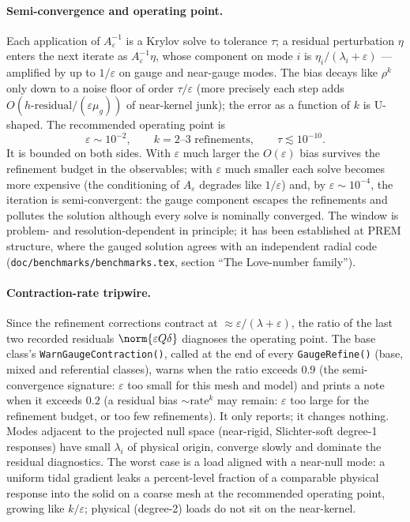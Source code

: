 \documentclass[11pt]{article}
\numberwithin{equation}{section}
\theoremstyle{remark}
\newcommand{\eps}{\varepsilon}
\newcommand{\code}[1]{\texttt{#1}}
\begin{document}
\paragraph{Semi-convergence and operating point.} Each application of
$A_\eps^{-1}$ is a Krylov solve to tolerance $\tau$; a residual
perturbation $\eta$ enters the next iterate as $A_\eps^{-1}\eta$, whose
component on mode $i$ is $\eta_i/(\lambda_i + \eps)$ --- amplified by up
to $1/\eps$ on gauge and near-gauge modes. The bias decays like $\rho^k$ only down to a
noise floor of order $\tau/\eps$ (more precisely each step adds
$O(h\text{-residual}/(\eps\mu_g))$ of near-kernel junk); the error as a
function of $k$ is U-shaped. The recommended operating point is
\begin{equation}
  \eps\sim10^{-2}, \qquad k = 2\text{--}3
  \text{ refinements}, \qquad \tau\lesssim10^{-10} .
\end{equation}
It is bounded on both sides. With $\eps$ much larger the $O(\eps)$ bias
survives the refinement budget in the observables; with $\eps$ much
smaller each solve becomes more expensive (the conditioning of $A_\eps$
degrades like $1/\eps$) and, by $\eps\sim10^{-4}$, the iteration is
semi-convergent: the gauge component escapes the refinements and
pollutes the solution although every solve is nominally converged. The
window is problem- and resolution-dependent in principle; it has been
established at PREM structure, where the gauged solution agrees with an
independent radial code (\code{doc/benchmarks/benchmarks.tex}, section ``The
Love-number family'').

\paragraph{Contraction-rate tripwire.} Since the refinement corrections
contract at $\approx\eps/(\lambda + \eps)$, the ratio of the last two
recorded residuals $\norm{\eps Q\delta}$ diagnoses the operating point.
The base class's \code{WarnGaugeContraction()}, called at the end of
every \code{GaugeRefine()} (base, mixed and referential classes), warns
when the ratio exceeds $0.9$
(the semi-convergence signature: $\eps$ too small for this mesh and model)
and prints a note when it exceeds $0.2$ (a residual bias $\sim
\text{rate}^k$ may remain: $\eps$ too large for the refinement budget, or
too few refinements). It only reports; it changes nothing.
Modes adjacent to the projected null space (near-rigid, Slichter-soft
degree-1 responses) have small $\lambda_i$ of physical origin, converge
slowly and dominate the residual diagnostics. The worst case is a load
aligned with a near-null mode: a uniform tidal gradient leaks a
percent-level fraction of a comparable physical response into the solid on
a coarse mesh at the recommended operating point, growing like $k/\eps$;
physical (degree-2) loads do not sit on the near-kernel.
\end{document}

